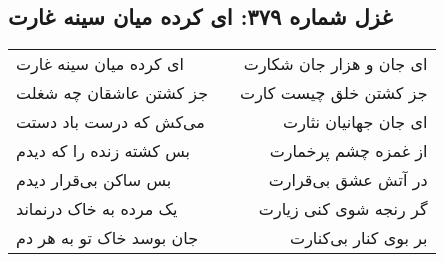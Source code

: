 \begin{center}
\section*{غزل شماره ۳۷۹: ای کرده میان سینه غارت}
\label{sec:0379}
\begin{longtable}{l p{0.5cm} r}
ای کرده میان سینه غارت
&&
ای جان و هزار جان شکارت
\\
جز کشتن عاشقان چه شغلت
&&
جز کشتن خلق چیست کارت
\\
می‌کش که درست باد دستت
&&
ای جان جهانیان نثارت
\\
بس کشته زنده را که دیدم
&&
از غمزه چشم پرخمارت
\\
بس ساکن بی‌قرار دیدم
&&
در آتش عشق بی‌قرارت
\\
یک مرده به خاک درنماند
&&
گر رنجه شوی کنی زیارت
\\
جان بوسد خاک تو به هر دم
&&
بر بوی کنار بی‌کنارت
\\
\end{longtable}
\end{center}
